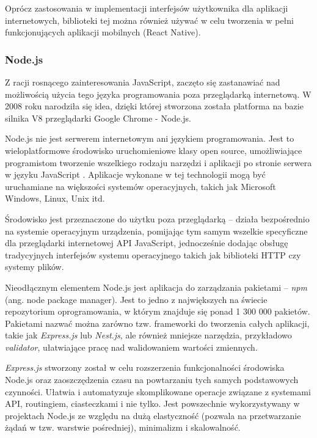 \documentclass[12pt,twoside]{article}
\begin{document}
Oprócz zastosowania w implementacji interfejsów użytkownika dla aplikacji internetowych, biblioteki tej można również używać w celu tworzenia w pełni funkcjonujących aplikacji mobilnych (React Native).

\subsubsection{Node.js}

Z racji rosnącego zainteresowania JavaScript, zaczęto się zastanawiać nad możliwością użycia tego języka programowania poza przeglądarką internetową. W 2008 roku narodziła się idea, dzięki której stworzona została platforma na bazie silnika V8 przeglądarki Google Chrome - Node.js. 

Node.js nie jest serwerem internetowym ani językiem programowania. Jest to wieloplatformowe środowisko uruchomieniowe klasy open source, umożliwiające programistom tworzenie wszelkiego rodzaju narzędzi i aplikacji po stronie serwera w języku JavaScript \cite{NodejsWhatIs}. Aplikacje wykonane w tej technologii mogą być uruchamiane na większości systemów operacyjnych, takich jak Microsoft Windows, Linux, Unix itd.

Środowisko jest przeznaczone do użytku poza przeglądarką -- działa bezpośrednio na systemie operacyjnym urządzenia, pomijając tym samym wszelkie specyficzne dla przeglądarki internetowej API JavaScript, jednocześnie dodając obsługę tradycyjnych interfejsów systemu operacyjnego takich jak biblioteki HTTP czy systemy plików.

Nieodłącznym elementem Node.js jest aplikacja do zarządzania pakietami -- \emph{npm} (ang. node package manager). Jest to jedno z największych na świecie repozytorium oprogramowania, w którym znajduje się ponad 1 300 000 pakietów. Pakietami nazwać można zarówno tzw. frameworki do tworzenia całych aplikacji, takie jak \emph{Express.js} lub \emph{Nest.js}, ale również mniejsze narzędzia, przykładowo \emph{validator}, ułatwiające pracę nad walidowaniem wartości zmiennych.

\emph{Express.js} stworzony został w celu rozszerzenia funkcjonalności środowiska Node.js oraz zaoszczędzenia czasu na powtarzaniu tych samych podstawowych czynności. Ułatwia i automatyzuje skomplikowane operacje związane z systemami API, routingiem, ciasteczkami i nie tylko. Jest powszechnie wykorzystywany w projektach Node.js ze względu na dużą elastyczność (pozwala na przetwarzanie żądań w tzw. warstwie pośredniej), minimalizm i skalowalność.
\end{document}
